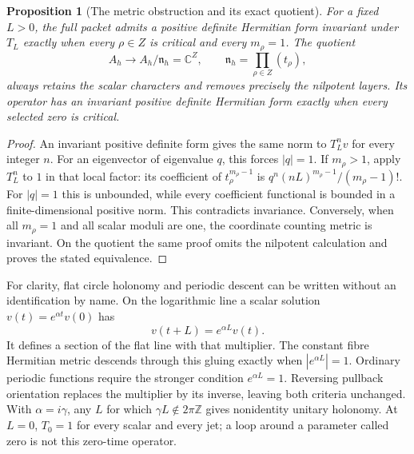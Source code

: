 \documentclass[11pt]{article}
\newtheorem{proposition}[theorem]{Proposition}
\newcommand{\C}{\mathbb C}
\newcommand{\Z}{\mathbb Z}
\begin{document}
\begin{proposition}[The metric obstruction and its exact quotient]
\label{hw:metricprop}
For a fixed \(L>0\), the full packet admits a positive definite
Hermitian form invariant under \(T_L\) exactly when every
\(\rho\in Z\) is critical and every \(m_\rho=1\).
The quotient
\[
 A_h\longrightarrow A_h/\mathfrak n_h=\C^Z,\qquad
 \mathfrak n_h=\prod_{\rho\in Z}(t_\rho),
 \tag{HW16}\label{hw:nilquotient}
\]
always retains the scalar characters and removes precisely the
nilpotent layers. Its operator has an invariant positive definite
Hermitian form exactly when every selected zero is critical.
\end{proposition}
\begin{proof}
An invariant positive definite form gives the same norm to
\(T_L^nv\) for every integer \(n\). For an eigenvector of
eigenvalue \(q\), this forces \(|q|=1\).
If \(m_\rho>1\), apply \(T_L^n\) to \(1\) in that local
factor: its coefficient of \(t_\rho^{m_\rho-1}\) is
\(q^n(nL)^{m_\rho-1}/(m_\rho-1)!\).
For \(|q|=1\) this is unbounded, while every coefficient
functional is bounded in a finite-dimensional positive norm.
This contradicts invariance. Conversely, when all \(m_\rho=1\)
and all scalar moduli are one, the coordinate counting metric
is invariant. On the quotient the same proof omits the nilpotent
calculation and proves the stated equivalence.
\end{proof}

For clarity, flat circle holonomy and periodic descent can be
written without an identification by name. On the logarithmic
line a scalar solution \(v(t)=e^{\alpha t}v(0)\) has
\[
 v(t+L)=e^{\alpha L}v(t).
 \tag{HW17}
\]
It defines a section of the flat line with that multiplier.
The constant fibre Hermitian metric descends through this
gluing exactly when \(|e^{\alpha L}|=1\).
Ordinary periodic functions require the stronger condition
\(e^{\alpha L}=1\). Reversing pullback orientation replaces
the multiplier by its inverse, leaving both criteria unchanged.
With \(\alpha=i\gamma\), any \(L\) for which
\(\gamma L\notin2\pi\Z\) gives nonidentity unitary holonomy.
At \(L=0\), \(T_0=1\) for every scalar and every jet; a loop
around a parameter called zero is not this zero-time operator.
\end{document}
